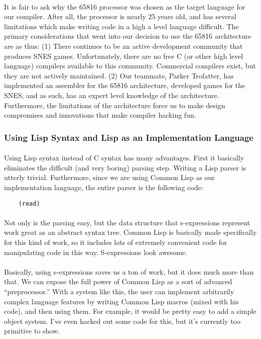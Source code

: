 \documentclass {article}
\begin{document}
\paragraph{}
It is fair to ask why the 65816 processor was chosen as the target
language for our compiler.  After all, the processor is nearly 25
years old, and has several limitations which make writing code in a
high a level language difficult.  The primary considerations that went
into our decision to use the 65816 architecture are as thus: (1) There
continues to be an active development community that produces SNES
games.  Unfortunately, there are no free C (or other high level
language) compilers available to this community.  Commercial compilers
exist, but they are not actively maintained.  (2) Our teammate, Parker
Trofatter, has implemented an assembler for the 65816 architecture,
developed games for the SNES, and as such, has an expert level
knowledge of the architecture. Furthermore, the limitations of the
architecture force us to make design compromises and innovations that
make compiler hacking fun.

\subsubsection{Using Lisp Syntax and Lisp as an Implementation Language}

\paragraph{}
Using Lisp syntax instead of C syntax has many advantages.  First it
basically eliminates the difficult (and very boring) parsing step.
Writing a Lisp parser is utterly trivial.  Furthermore, since we are
using Common Lisp as our implementation language, the entire parser is
the following code:

\begin{verbatim}
    (read)
\end{verbatim}

\paragraph{}
Not only is the parsing easy, but the data structure that
s-expressions represent work great as an abstract syntax tree.  Common
Lisp is basically made specifically for this kind of work, so it
includes lots of extremely convenient code for manipulating code in
this way.  S-expressions look awesome.

\paragraph{}
Basically, using s-expressions saves us a ton of work, but it does
much more than that.  We can expose the full power of Common Lisp as a
sort of advanced ``preprocessor.''  With a system like this, the user
can implement arbitrarily complex language features by writing Common
Lisp macros (mixed with his code), and then using them.  For example,
it would be pretty easy to add a simple object system.  I've even
hacked out some code for this, but it's currently too primitive to
show.
\end{document}
